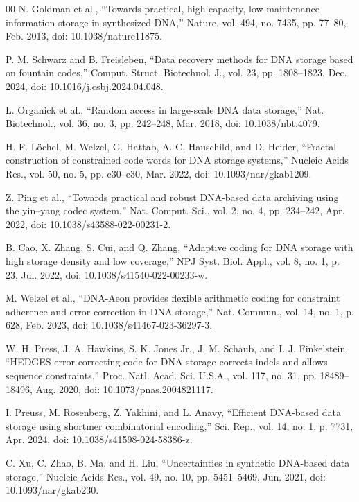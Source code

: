 \documentclass[conference]{IEEEtran}
\begin{document}
\begin{thebibliography}{00}
 N. Goldman et al., ``Towards practical, high-capacity, low-maintenance information storage in synthesized DNA,'' Nature, vol. 494, no. 7435, pp. 77--80, Feb. 2013, doi: 10.1038/nature11875.

 P. M. Schwarz and B. Freisleben, ``Data recovery methods for DNA storage based on fountain codes,'' Comput. Struct. Biotechnol. J., vol. 23, pp. 1808--1823, Dec. 2024, doi: 10.1016/j.csbj.2024.04.048.

 L. Organick et al., ``Random access in large-scale DNA data storage,'' Nat. Biotechnol., vol. 36, no. 3, pp. 242--248, Mar. 2018, doi: 10.1038/nbt.4079.

 H. F. L\"ochel, M. Welzel, G. Hattab, A.-C. Hauschild, and D. Heider, ``Fractal construction of constrained code words for DNA storage systems,'' Nucleic Acids Res., vol. 50, no. 5, pp. e30--e30, Mar. 2022, doi: 10.1093/nar/gkab1209.

 Z. Ping et al., ``Towards practical and robust DNA-based data archiving using the yin--yang codec system,'' Nat. Comput. Sci., vol. 2, no. 4, pp. 234--242, Apr. 2022, doi: 10.1038/s43588-022-00231-2.

 B. Cao, X. Zhang, S. Cui, and Q. Zhang, ``Adaptive coding for DNA storage with high storage density and low coverage,'' NPJ Syst. Biol. Appl., vol. 8, no. 1, p. 23, Jul. 2022, doi: 10.1038/s41540-022-00233-w.

 M. Welzel et al., ``DNA-Aeon provides flexible arithmetic coding for constraint adherence and error correction in DNA storage,'' Nat. Commun., vol. 14, no. 1, p. 628, Feb. 2023, doi: 10.1038/s41467-023-36297-3.

 W. H. Press, J. A. Hawkins, S. K. Jones Jr., J. M. Schaub, and I. J. Finkelstein, ``HEDGES error-correcting code for DNA storage corrects indels and allows sequence constraints,'' Proc. Natl. Acad. Sci. U.S.A., vol. 117, no. 31, pp. 18489--18496, Aug. 2020, doi: 10.1073/pnas.2004821117.

 I. Preuss, M. Rosenberg, Z. Yakhini, and L. Anavy, ``Efficient DNA-based data storage using shortmer combinatorial encoding,'' Sci. Rep., vol. 14, no. 1, p. 7731, Apr. 2024, doi: 10.1038/s41598-024-58386-z.

 C. Xu, C. Zhao, B. Ma, and H. Liu, ``Uncertainties in synthetic DNA-based data storage,'' Nucleic Acids Res., vol. 49, no. 10, pp. 5451--5469, Jun. 2021, doi: 10.1093/nar/gkab230.


\end{thebibliography}
\end{document}
